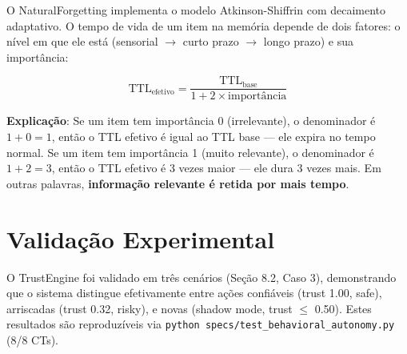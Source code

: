 
O NaturalForgetting implementa o modelo Atkinson-Shiffrin com decaimento adaptativo. O tempo de vida de um item na memória depende de dois fatores: o nível em que ele está (sensorial $\rightarrow$ curto prazo $\rightarrow$ longo prazo) e sua importância:

\begin{equation}
\text{TTL}_{\text{efetivo}} = \frac{\text{TTL}_{\text{base}}}{1 + 2 \times \text{importância}}
\label{eq:ttl}
\end{equation}

\textbf{Explicação}: Se um item tem importância 0 (irrelevante), o denominador é $1 + 0 = 1$, então o TTL efetivo é igual ao TTL base — ele expira no tempo normal. Se um item tem importância 1 (muito relevante), o denominador é $1 + 2 = 3$, então o TTL efetivo é 3 vezes maior — ele dura 3 vezes mais. Em outras palavras, \textbf{informação relevante é retida por mais tempo}.

\section{Validação Experimental}

O TrustEngine foi validado em três cenários (Seção 8.2, Caso 3), demonstrando que o sistema distingue efetivamente entre ações confiáveis (trust 1.00, safe), arriscadas (trust 0.32, risky), e novas (shadow mode, trust $\leq$ 0.50). Estes resultados são reproduzíveis via \texttt{python specs/test\_behavioral\_autonomy.py} (8/8 CTs).
